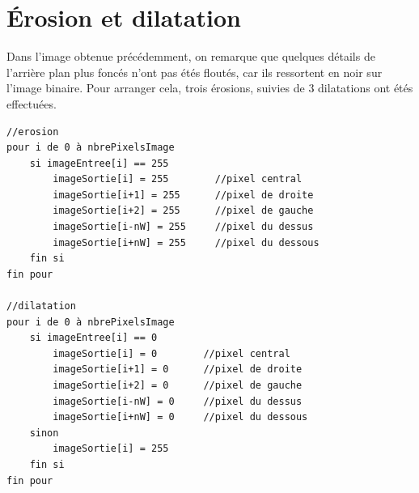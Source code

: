 \documentclass[a4paper,11pt]{article}
\begin{document}
\section{Érosion et dilatation}
Dans l'image obtenue précédemment, on remarque que quelques détails de l'arrière plan plus foncés n'ont pas étés floutés, car ils ressortent en noir sur l'image binaire. Pour arranger cela, trois érosions, suivies de 3 dilatations ont étés effectuées.
\begin{verbatim}
//erosion
pour i de 0 à nbrePixelsImage
    si imageEntree[i] == 255
        imageSortie[i] = 255        //pixel central
        imageSortie[i+1] = 255      //pixel de droite
        imageSortie[i+2] = 255      //pixel de gauche
        imageSortie[i-nW] = 255     //pixel du dessus
        imageSortie[i+nW] = 255     //pixel du dessous
    fin si
fin pour

//dilatation
pour i de 0 à nbrePixelsImage
    si imageEntree[i] == 0
        imageSortie[i] = 0        //pixel central
        imageSortie[i+1] = 0      //pixel de droite
        imageSortie[i+2] = 0      //pixel de gauche
        imageSortie[i-nW] = 0     //pixel du dessus
        imageSortie[i+nW] = 0     //pixel du dessous
    sinon
        imageSortie[i] = 255
    fin si
fin pour
\end{verbatim}
\end{document}
